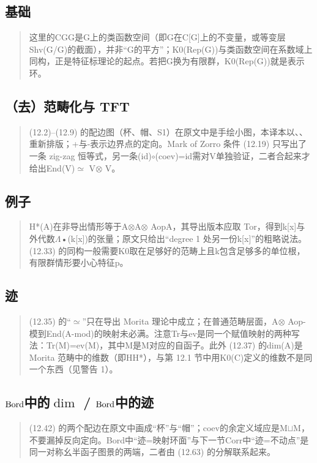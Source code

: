 \subsection*{基础}
\begin{quote}\small
这里的CGG是G上的类函数空间（即G在C[G]上的不变量，或等变层Shv(G/G)的截面），并非“G的平方”；K0(Rep(G))与类函数空间在系数域上同构，正是特征标理论的起点。若把G换为有限群，K0(Rep(G))就是表示环。
\end{quote}

\subsection*{（去）范畴化与 TFT}
\begin{quote}\small
(12.2)–(12.9) 的配边图（杯、帽、S1）在原文中是手绘小图，本译本以、、重新排版；+与-表示边界点的定向。Mark of Zorro 条件 (12.19) 只写出了一条 zig-zag 恒等式，另一条(id)$\circ$(coev)=id需对V单独验证，二者合起来才给出End(V)$\simeq$ V$\otimes$ V。
\end{quote}

\subsection*{例子}
\begin{quote}\small
H*(A)在非导出情形等于A$\otimes$A$\otimes$ AopA，其导出版本应取 Tor，得到k[x]与外代数$\Lambda$•(k[x])的张量；原文只给出“degree 1 处另一份k[x]”的粗略说法。(12.33) 的同构一般需要K0取在足够好的范畴上且k包含足够多的单位根，有限群情形要小心特征p。
\end{quote}

\subsection*{迹}
\begin{quote}\small
(12.35) 的“$\simeq$”只在导出 Morita 理论中成立；在普通范畴层面，A$\otimes$ Aop-模到End(A-mod)的映射未必满。注意Tr与ev是同一个赋值映射的两种写法：Tr(M)=ev(M)，其中M是M对应的自函子。此外 (12.37) 的dim(A)是 Morita 范畴中的维数（即HH*），与第 12.1 节中用K0(C)定义的维数不是同一个东西（见警告 1）。
\end{quote}

\subsection*{$\mathrm{Bord}$中的$\dim$ / $\mathrm{Bord}$中的迹}
\begin{quote}\small
(12.42) 的两个配边在原文中画成“杯”与“帽”；coev的余定义域应是M$\sqcup$M，不要漏掉反向定向。Bord中“迹=映射环面”与下一节Corr中“迹=不动点”是同一对称幺半函子图景的两端，二者由 (12.63) 的分解联系起来。
\end{quote}

